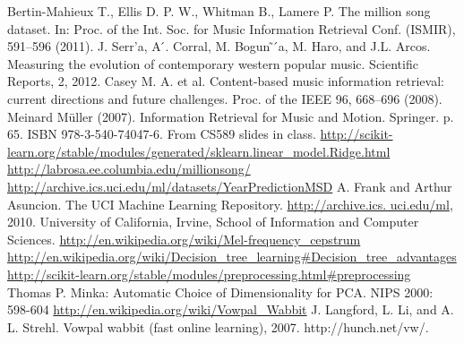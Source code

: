 \documentclass{article} %
\begin{document}
\begin{thebibliography}{1}
	 Bertin-Mahieux T., Ellis D. P. W., Whitman B., Lamere P. The million song dataset. In: Proc. of the Int. Soc. for Music Information Retrieval Conf. (ISMIR), 591–596 (2011).
	 J. Serr'a, A ́. Corral, M. Bogun ̃ ́a, M. Haro, and J.L. Arcos. Measuring the evolution of contemporary western popular music. Scientific Reports, 2, 2012.
	 Casey M. A. et al. Content-based music information retrieval: current directions and future challenges. Proc. of the IEEE 96, 668–696 (2008).
	 Meinard Müller (2007). Information Retrieval for Music and Motion. Springer. p. 65. ISBN 978-3-540-74047-6.
	 From CS589 slides in class. 
	 \url{http://scikit-learn.org/stable/modules/generated/sklearn.linear_model.Ridge.html}
	 \url{http://labrosa.ee.columbia.edu/millionsong/}
	 \url{http://archive.ics.uci.edu/ml/datasets/YearPredictionMSD}
	 A. Frank and Arthur Asuncion. The UCI Machine Learning Repository. \url{http://archive.ics.
	uci.edu/ml}, 2010. University of California, Irvine, School of Information and Computer Sciences.
	 \url{http://en.wikipedia.org/wiki/Mel-frequency_cepstrum}
	 \url{http://en.wikipedia.org/wiki/Decision_tree_learning#Decision_tree_advantages}
	 \url{http://scikit-learn.org/stable/modules/preprocessing.html#preprocessing}
	 Thomas P. Minka: Automatic Choice of Dimensionality for PCA. NIPS 2000: 598-604
	 \url{http://en.wikipedia.org/wiki/Vowpal_Wabbit}
	 J. Langford, L. Li, and A. L. Strehl. Vowpal wabbit (fast online learning), 2007. http://hunch.net/vw/.
	
	
	
\end{thebibliography}
\end{document}
